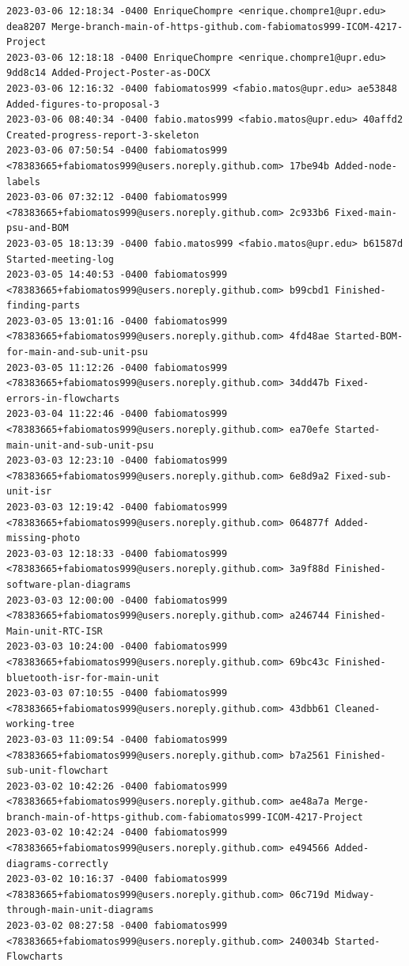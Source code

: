 \documentclass[12pt]{article}
\begin{document}
\begin{lstlisting}
2023-03-06 12:18:34 -0400 EnriqueChompre <enrique.chompre1@upr.edu> dea8207 Merge-branch-main-of-https-github.com-fabiomatos999-ICOM-4217-Project
2023-03-06 12:18:18 -0400 EnriqueChompre <enrique.chompre1@upr.edu> 9dd8c14 Added-Project-Poster-as-DOCX
2023-03-06 12:16:32 -0400 fabiomatos999 <fabio.matos@upr.edu> ae53848 Added-figures-to-proposal-3
2023-03-06 08:40:34 -0400 fabio.matos999 <fabio.matos@upr.edu> 40affd2 Created-progress-report-3-skeleton
2023-03-06 07:50:54 -0400 fabiomatos999 <78383665+fabiomatos999@users.noreply.github.com> 17be94b Added-node-labels
2023-03-06 07:32:12 -0400 fabiomatos999 <78383665+fabiomatos999@users.noreply.github.com> 2c933b6 Fixed-main-psu-and-BOM
2023-03-05 18:13:39 -0400 fabio.matos999 <fabio.matos@upr.edu> b61587d Started-meeting-log
2023-03-05 14:40:53 -0400 fabiomatos999 <78383665+fabiomatos999@users.noreply.github.com> b99cbd1 Finished-finding-parts
2023-03-05 13:01:16 -0400 fabiomatos999 <78383665+fabiomatos999@users.noreply.github.com> 4fd48ae Started-BOM-for-main-and-sub-unit-psu
2023-03-05 11:12:26 -0400 fabiomatos999 <78383665+fabiomatos999@users.noreply.github.com> 34dd47b Fixed-errors-in-flowcharts
2023-03-04 11:22:46 -0400 fabiomatos999 <78383665+fabiomatos999@users.noreply.github.com> ea70efe Started-main-unit-and-sub-unit-psu
2023-03-03 12:23:10 -0400 fabiomatos999 <78383665+fabiomatos999@users.noreply.github.com> 6e8d9a2 Fixed-sub-unit-isr
2023-03-03 12:19:42 -0400 fabiomatos999 <78383665+fabiomatos999@users.noreply.github.com> 064877f Added-missing-photo
2023-03-03 12:18:33 -0400 fabiomatos999 <78383665+fabiomatos999@users.noreply.github.com> 3a9f88d Finished-software-plan-diagrams
2023-03-03 12:00:00 -0400 fabiomatos999 <78383665+fabiomatos999@users.noreply.github.com> a246744 Finished-Main-unit-RTC-ISR
2023-03-03 10:24:00 -0400 fabiomatos999 <78383665+fabiomatos999@users.noreply.github.com> 69bc43c Finished-bluetooth-isr-for-main-unit
2023-03-03 07:10:55 -0400 fabiomatos999 <78383665+fabiomatos999@users.noreply.github.com> 43dbb61 Cleaned-working-tree
2023-03-03 11:09:54 -0400 fabiomatos999 <78383665+fabiomatos999@users.noreply.github.com> b7a2561 Finished-sub-unit-flowchart
2023-03-02 10:42:26 -0400 fabiomatos999 <78383665+fabiomatos999@users.noreply.github.com> ae48a7a Merge-branch-main-of-https-github.com-fabiomatos999-ICOM-4217-Project
2023-03-02 10:42:24 -0400 fabiomatos999 <78383665+fabiomatos999@users.noreply.github.com> e494566 Added-diagrams-correctly
2023-03-02 10:16:37 -0400 fabiomatos999 <78383665+fabiomatos999@users.noreply.github.com> 06c719d Midway-through-main-unit-diagrams
2023-03-02 08:27:58 -0400 fabiomatos999 <78383665+fabiomatos999@users.noreply.github.com> 240034b Started-Flowcharts

\end{lstlisting}
\end{document}
